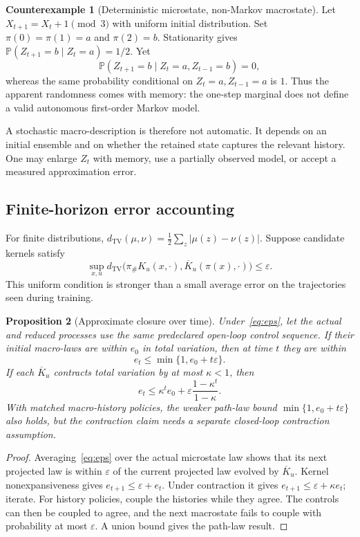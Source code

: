 \documentclass[11pt,letterpaper]{article}
\theoremstyle{plain}
\newtheorem{proposition}{Proposition}[section]
\theoremstyle{definition}
\newtheorem{counterexample}[proposition]{Counterexample}
\theoremstyle{remark}
\newcommand{\TV}{d_{\mathrm{TV}}}
\newcommand{\Prob}{\mathbb P}
\newcommand{\push}{\pi_{\#}}
\begin{document}
\begin{counterexample}[Deterministic microstate, non-Markov macrostate]\label{ex:cycle}
Let $X_{t+1}=X_t+1\pmod 3$ with uniform initial distribution. Set $\pi(0)=\pi(1)=a$ and $\pi(2)=b$. Stationarity gives $\Prob(Z_{t+1}=b\mid Z_t=a)=1/2$. Yet
\[
\Prob(Z_{t+1}=b\mid Z_t=a,Z_{t-1}=b)=0,
\]
whereas the same probability conditional on $Z_t=a,Z_{t-1}=a$ is $1$. Thus the apparent randomness comes with memory: the one-step marginal does not define a valid autonomous first-order Markov model.
\end{counterexample}

A stochastic macro-description is therefore not automatic. It depends on an initial ensemble and on whether the retained state captures the relevant history. One may enlarge $Z_t$ with memory, use a partially observed model, or accept a measured approximation error.

\subsection{Finite-horizon error accounting}
For finite distributions, $\TV(\mu,\nu)=\tfrac12\sum_z|\mu(z)-\nu(z)|$. Suppose candidate kernels satisfy
\begin{equation}\label{eq:eps}
\sup_{x,u}\TV\bigl(\push K_u(x,\cdot),\overline K_u(\pi(x),\cdot)\bigr)
\leq\varepsilon.
\end{equation}
This uniform condition is stronger than a small average error on the trajectories seen during training.

\begin{proposition}[Approximate closure over time]\label{prop:time}
Under~\eqref{eq:eps}, let the actual and reduced processes use the same predeclared open-loop control sequence. If their initial macro-laws are within $e_0$ in total variation, then at time $t$ they are within
\[
e_t\leq\min\{1,e_0+t\varepsilon\}.
\]
If each $\overline K_u$ contracts total variation by at most $\kappa<1$, then
\begin{equation}\label{eq:contract}
e_t\leq\kappa^t e_0+\varepsilon\frac{1-\kappa^t}{1-\kappa}.
\end{equation}
With matched macro-history policies, the weaker path-law bound $\min\{1,e_0+t\varepsilon\}$ also holds, but the contraction claim needs a separate closed-loop contraction assumption.
\end{proposition}
\begin{proof}
Averaging~\eqref{eq:eps} over the actual microstate law shows that its next projected law is within $\varepsilon$ of the current projected law evolved by $\overline K_u$. Kernel nonexpansiveness gives $e_{t+1}\leq\varepsilon+e_t$. Under contraction it gives $e_{t+1}\leq\varepsilon+\kappa e_t$; iterate. For history policies, couple the histories while they agree. The controls can then be coupled to agree, and the next macrostate fails to couple with probability at most $\varepsilon$. A union bound gives the path-law result.
\end{proof}
\end{document}
